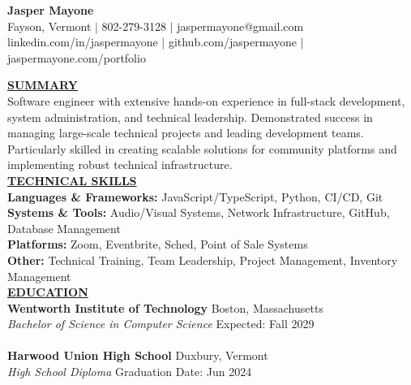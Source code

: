 \documentclass{article}
\begin{document}
\begin{center}
\thispagestyle{empty}
\large \textbf{Jasper Mayone \\}
\normalsize Fayson, Vermont $\mid$ 802-279-3128 $\mid$ jaspermayone@gmail.com \\
\normalsize linkedin.com/in/jaspermayone $\mid$ github.com/jaspermayone $\mid$ jaspermayone.com/portfolio \\
\hrulefill
\end{center}

\noindent \textbf{\underline{SUMMARY}} \\
Software engineer with extensive hands-on experience in full-stack development, system administration, and technical leadership. Demonstrated success in managing large-scale technical projects and leading development teams. Particularly skilled in creating scalable solutions for community platforms and implementing robust technical infrastructure. \\

\noindent \textbf{\underline{TECHNICAL SKILLS}} \\
\noindent \textbf{Languages \& Frameworks:} JavaScript/TypeScript, Python, CI/CD, Git \\
\noindent \textbf{Systems \& Tools:} Audio/Visual Systems, Network Infrastructure, GitHub, Database Management \\
\noindent \textbf{Platforms:} Zoom, Eventbrite, Sched, Point of Sale Systems \\
\noindent \textbf{Other:} Technical Training, Team Leadership, Project Management, Inventory Management \\

\noindent \textbf{\underline{EDUCATION}} \\
\textbf{Wentworth Institute of Technology} \hfill Boston, Massachusetts \\
\textit{Bachelor of Science in Computer Science} \hfill Expected: Fall 2029 \\ \\
\textbf{Harwood Union High School} \hfill Duxbury, Vermont \\
\textit{High School Diploma} \hfill Graduation Date: Jun 2024 \\
\end{document}
